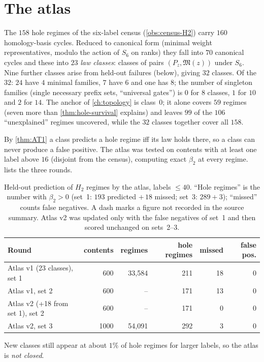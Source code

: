 \section{The atlas}\label{sec:atlas-census}
\begin{observation}\label{obs:atlas}
The $158$ hole regimes of the six-label census (\cref{obs:census-H2}) carry $160$ homology-basis cycles. Reduced to canonical form (minimal weight representatives, modulo the action of $S_6$ on ranks) they fall into $70$ canonical cycles and these into $23$ \emph{law classes}: classes of pairs $(P_z,\mathfrak M(z))$ under $S_6$. Nine further classes arise from held-out failures (below), giving $32$ classes. Of the $32$: $24$ have $4$ minimal families, $7$ have $6$ and one has $8$; the number of singleton families (single necessary prefix sets, ``universal gates'') is $0$ for $8$ classes, $1$ for $10$ and $2$ for $14$. The anchor of \cref{ch:topology} is class~$0$; it alone covers $59$ regimes (seven more than \cref{thm:hole-survival} explains) and leaves $99$ of the $106$ ``unexplained'' regimes uncovered, while the $32$ classes together cover all $158$.
\end{observation}
\begin{observation}\label{obs:atlas-pred}
By \cref{thm:AT1} a class predicts a hole regime iff its law holds there, so a class can never produce a false positive. The atlas was tested on contents with at least one label above $16$ (disjoint from the census), computing exact $\beta_2$ at every regime.  lists the three rounds.
\begin{table}[ht]\centering\small
\begin{tabular}{@{}lrrrrr@{}}
\toprule
Round & contents & regimes & hole regimes & missed & false pos.\\ \midrule
Atlas v1 (23 classes), set 1 & 600 & 33{,}584 & 211 & 18 & 0\\
Atlas v1, set 2 & 600 & -- & 171 & 13 & 0\\
Atlas v2 (+18 from set 1), set 2 & 600 & -- & 171 & 0 & 0\\
Atlas v2, set 3 & 1000 & 54{,}091 & 292 & 3 & 0\\ \bottomrule
\end{tabular}
\caption{Held-out prediction of $H_2$ regimes by the atlas, labels $\le40$. ``Hole regimes'' is the number with $\beta_2>0$ (set~1: $193$ predicted $+\,18$ missed; set~3: $289+3$); ``missed'' counts false negatives. A dash marks a figure not recorded in the source summary. Atlas v2 was updated only with the false negatives of set~1 and then scored unchanged on sets~2--3.}\label{tab:atlas-pred}
\end{table}
New classes still appear at about $1\%$ of hole regimes for larger labels, so the atlas is \emph{not closed}.
\end{observation}

